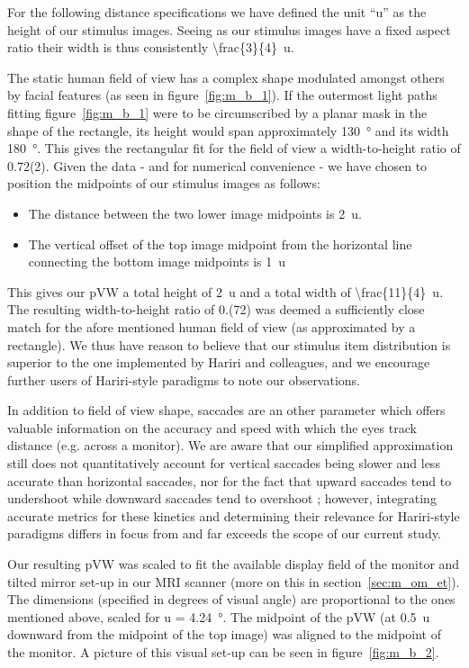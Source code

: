 	For the following distance specifications we have defined the unit “u” as the height of our stimulus images.
	Seeing as our stimulus images have a fixed aspect ratio their width is thus consistently \SI[parse-numbers = false]{\frac{3}{4}}{u}.
	
	The static human field of view has a complex shape modulated amongst others by facial features (as seen in figure~\ref{fig:m_b_1}).
	If the outermost light paths fitting figure~\ref{fig:m_b_1} were to be circumscribed by a planar mask in the shape of the rectangle, its height would span approximately \SI{130}{\degree} and its width \SI{180}{\degree}.
	This gives the rectangular fit for the field of view a width-to-height ratio of 0.72(2).
	Given the data - and for numerical convenience - we have chosen to position the midpoints of our stimulus images as follows:
	\begin{itemize}
	    \item The distance between the two lower image midpoints is \SI{2}{u}.
	    \item The vertical offset of the top image midpoint from the horizontal line connecting the bottom image midpoints is \SI{1}{u}
	\end{itemize}
	This gives our pVW a total height of \SI{2}{u} and a total width of \SI[parse-numbers = false]{\frac{11}{4}}{u}.
	The resulting width-to-height ratio of 0.(72) was deemed a sufficiently close match for the afore mentioned human field of view (as approximated by a rectangle).
	We thus have reason to believe that our stimulus item distribution is superior to the one implemented by Hariri and colleagues, and we encourage further users of Hariri-style paradigms to note our observations.  
	
	In addition to field of view shape, saccades are an other parameter which offers valuable information on the accuracy and speed with which the eyes track distance (e.g. across a monitor).
	We are aware that our simplified approximation still does not quantitatively account for vertical saccades being slower \citep{TerryBahill1975} and less accurate \citep{Collewijn1988} than horizontal saccades, 
	nor for the fact that upward saccades tend to undershoot while downward saccades tend to overshoot \citep{Collewijn1988};
	however, integrating accurate metrics for these kinetics and determining their relevance for Hariri-style paradigms differs in focus from and far exceeds the scope of our current study.
	
	Our resulting pVW was scaled to fit the available display field of the monitor and tilted mirror set-up in our MRI scanner (more on this in section~\ref{sec:m_om_et}).
	The dimensions (specified in degrees of visual angle) are proportional to the ones mentioned above, scaled for u = \SI{4.24}{\degree}.
	The midpoint of the pVW (at \SI{0.5}{u} downward from the midpoint of the top image) was aligned to the midpoint of the monitor.
	A picture of this visual set-up can be seen in figure~\ref{fig:m_b_2}.
	
